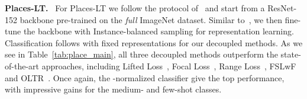 \documentclass[dvipsnames]{article} \usepackage{iclr2020_conference, times}
\newcommand{\header}[1]{\noindent\textbf{#1.}~}
\newcommand{\Uniform}{Instance-balanced\xspace}
\begin{document}
\header{Places-LT} For Places-LT we follow the protocol of~\citet{liu2019large} and start from a ResNet-152 backbone pre-trained on the \emph{full} ImageNet dataset. Similar to~\citet{liu2019large}, we then fine-tune the backbone with \Uniform sampling for representation learning. Classification follows with fixed representations for our decoupled methods. As we see in Table~\ref{tab:place_main}, all three decoupled methods outperform the state-of-the-art approaches, including Lifted Loss~\citep{oh2016deep}, Focal Loss~\citep{lin2017focal}, Range Loss~\citep{zhang2017range}, FSLwF~\citep{gidaris2018dynamic} and OLTR~\citep{liu2019large}. Once again, the -normalized classifier give the top performance, with impressive gains for the medium- and few-shot classes.


\begin{table}


\end{table}
\end{document}
